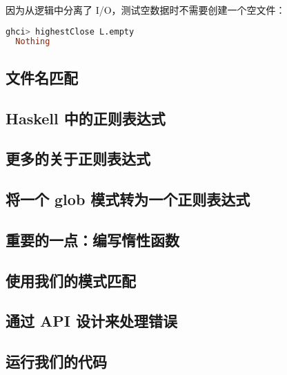 \documentclass[./main.tex]{subfiles}
\begin{document}
因为从逻辑中分离了 I/O，测试空数据时不需要创建一个空文件：

\begin{lstlisting}[language=Haskell]
  ghci> highestClose L.empty
  Nothing
\end{lstlisting}

\subsection*{文件名匹配}

\subsection*{Haskell 中的正则表达式}

\subsection*{更多的关于正则表达式}

\subsection*{将一个 glob 模式转为一个正则表达式}

\subsection*{重要的一点：编写惰性函数}

\subsection*{使用我们的模式匹配}

\subsection*{通过 API 设计来处理错误}

\subsection*{运行我们的代码}
\end{document}
